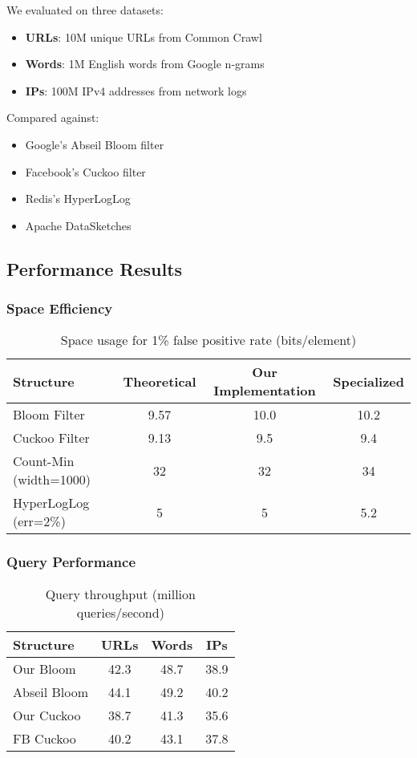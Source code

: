 \documentclass[11pt]{article}
\begin{document}
We evaluated on three datasets:
\begin{itemize}
\item \textbf{URLs}: 10M unique URLs from Common Crawl
\item \textbf{Words}: 1M English words from Google n-grams
\item \textbf{IPs}: 100M IPv4 addresses from network logs
\end{itemize}

Compared against:
\begin{itemize}
\item Google's Abseil Bloom filter
\item Facebook's Cuckoo filter
\item Redis's HyperLogLog
\item Apache DataSketches
\end{itemize}

\subsection{Performance Results}

\subsubsection{Space Efficiency}

\begin{table}[h]
\centering
\caption{Space usage for 1\% false positive rate (bits/element)}
\begin{tabular}{lccc}
\toprule
Structure & Theoretical & Our Implementation & Specialized \\
\midrule
Bloom Filter & 9.57 & 10.0 & 10.2 \\
Cuckoo Filter & 9.13 & 9.5 & 9.4 \\
Count-Min (width=1000) & 32 & 32 & 34 \\
HyperLogLog (err=2\%) & 5 & 5 & 5.2 \\
\bottomrule
\end{tabular}
\end{table}

\subsubsection{Query Performance}

\begin{table}[h]
\centering
\caption{Query throughput (million queries/second)}
\begin{tabular}{lccc}
\toprule
Structure & URLs & Words & IPs \\
\midrule
Our Bloom & 42.3 & 48.7 & 38.9 \\
Abseil Bloom & 44.1 & 49.2 & 40.2 \\
Our Cuckoo & 38.7 & 41.3 & 35.6 \\
FB Cuckoo & 40.2 & 43.1 & 37.8 \\
\bottomrule
\end{tabular}
\end{table}
\end{document}
